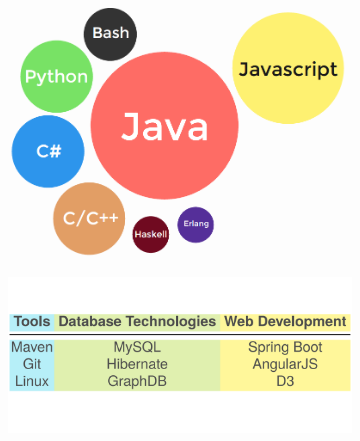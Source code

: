 \documentclass[]{friggeri-cv}
\begin{document}
\begin{figure}[h!]  
    \begin{subfigure}[b]{0.4\textwidth}
         \includegraphics[scale=0.15]{img/programming_language_skills.png}
    \end{subfigure}
    \begin{subfigure}[b]{0.6\textwidth}
        \includegraphics[scale=0.15]{img/programming_technologies.png}
    
    \end{subfigure}
\end{figure}
\end{document}
